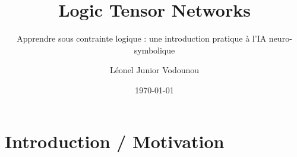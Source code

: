 \documentclass[aspectratio=169,10pt]{beamer}
\title{Logic Tensor Networks}
\subtitle{Apprendre sous contrainte logique : une introduction pratique à l'IA neuro-symbolique}
\author{Léonel Junior Vodounou}
\institute{\textcolor{ash}{[institution à compléter]}}
\date{\today}
\begin{document}
\maketitle

\section{Introduction / Motivation}

\end{document}

